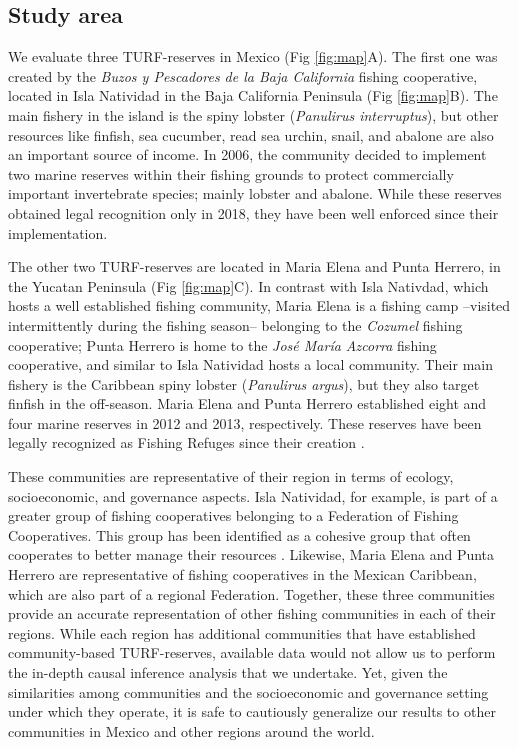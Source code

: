 \documentclass{frontiersSCNS}
\begin{document}
\subsection{Study area}\label{study-area}

We evaluate three TURF-reserves in Mexico (Fig \ref{fig:map}A). The
first one was created by the \emph{Buzos y Pescadores de la Baja
California} fishing cooperative, located in Isla Natividad in the Baja
California Peninsula (Fig \ref{fig:map}B). The main fishery in the
island is the spiny lobster (\emph{Panulirus interruptus}), but other
resources like finfish, sea cucumber, read sea urchin, snail, and
abalone are also an important source of income. In 2006, the community
decided to implement two marine reserves within their fishing grounds to
protect commercially important invertebrate species; mainly lobster and
abalone. While these reserves obtained legal recognition only in 2018,
they have been well enforced since their implementation.

The other two TURF-reserves are located in Maria Elena and Punta
Herrero, in the Yucatan Peninsula (Fig \ref{fig:map}C). In contrast with
Isla Nativdad, which hosts a well established fishing community, Maria
Elena is a fishing camp --visited intermittently during the fishing
season-- belonging to the \emph{Cozumel} fishing cooperative; Punta
Herrero is home to the \emph{José María Azcorra} fishing cooperative,
and similar to Isla Natividad hosts a local community. Their main
fishery is the Caribbean spiny lobster (\emph{Panulirus argus}), but
they also target finfish in the off-season. Maria Elena and Punta
Herrero established eight and four marine reserves in 2012 and 2013,
respectively. These reserves have been legally recognized as Fishing
Refuges since their creation \citep{dof_website_2012,dof_website_2013}.

These communities are representative of their region in terms of
ecology, socioeconomic, and governance aspects. Isla Natividad, for
example, is part of a greater group of fishing cooperatives belonging to
a Federation of Fishing Cooperatives. This group has been identified as
a cohesive group that often cooperates to better manage their resources
\citep{mccay_2017-1m,mccay_2014-CN,acevesbueno_2017}. Likewise, Maria
Elena and Punta Herrero are representative of fishing cooperatives in
the Mexican Caribbean, which are also part of a regional Federation.
Together, these three communities provide an accurate representation of
other fishing communities in each of their regions. While each region
has additional communities that have established community-based
TURF-reserves, available data would not allow us to perform the in-depth
causal inference analysis that we undertake. Yet, given the similarities
among communities and the socioeconomic and governance setting under
which they operate, it is safe to cautiously generalize our results to
other communities in Mexico and other regions around the world.
\end{document}
